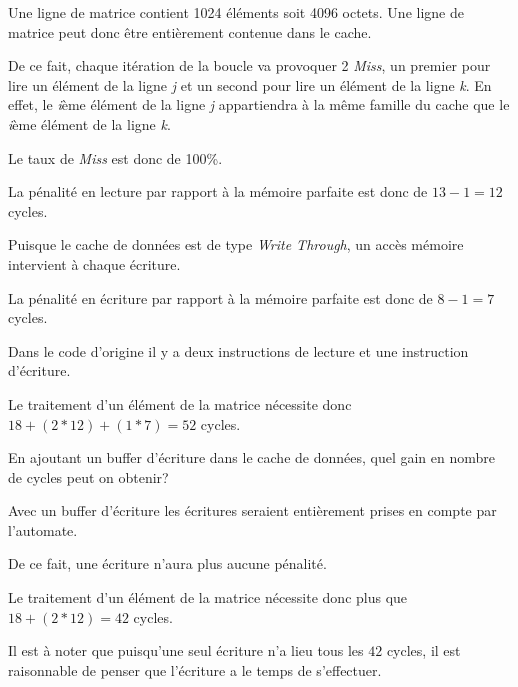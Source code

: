 \begin{correction}

Une ligne de matrice contient 1024 \'el\'ements soit 4096 octets. Une ligne
de matrice peut donc \^etre enti\`erement contenue dans le cache.

De ce fait, chaque it\'eration de la boucle va provoquer 2 \textit{Miss},
un premier pour lire un \'el\'ement de la ligne \textit{j} et un second
pour lire un \'el\'ement de la ligne \textit{k}. En effet, le \textit{i}\`eme
\'el\'ement de la ligne \textit{j} appartiendra \`a la m\^eme famille
du cache que le \textit{i}\`eme \'el\'ement de la ligne \textit{k}.

Le taux de \textit{Miss} est donc de 100\%.

La p\'enalit\'e en lecture par rapport \`a la m\'emoire parfaite est
donc de $13 - 1 = 12$ cycles.

Puisque le cache de donn\'ees est de type \textit{Write Through}, un
acc\`es m\'emoire intervient \`a chaque \'ecriture.

La p\'enalit\'e en \'ecriture par rapport \`a la m\'emoire parfaite est
donc de $8 - 1 = 7$ cycles.

Dans le code d'origine il y a deux instructions de lecture et une
instruction d'\'ecriture.

Le traitement d'un \'el\'ement de la matrice n\'ecessite donc
$18 + (2 * 12) + (1 * 7) = 52$ cycles.

\end{correction}

En ajoutant un buffer d'\'ecriture dans le cache de donn\'ees, quel
gain en nombre de cycles peut on obtenir?

\begin{correction}

Avec un buffer d'\'ecriture les \'ecritures seraient enti\`erement prises
en compte par l'automate.

De ce fait, une \'ecriture n'aura plus aucune p\'enalit\'e.

Le traitement d'un \'el\'ement de la matrice n\'ecessite donc plus
que $18 + (2 * 12) = 42$ cycles.

Il est \`a noter que puisqu'une seul \'ecriture n'a lieu tous les $42$
cycles, il est raisonnable de penser que l'\'ecriture a le temps de
s'effectuer.

\end{correction}


